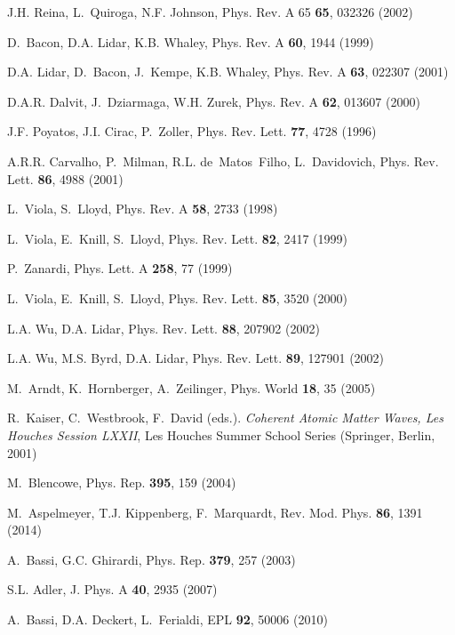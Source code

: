 \documentclass[aps,pra,reprint,amsmath,amssymb,showpacs,nofootinbib,floatfix,onecolumn,12pt]{revtex4-1}
\begin{document}
\begin{thebibliography}{100}
J.H. Reina, L.~Quiroga, N.F. Johnson, Phys. Rev. A 65 \textbf{65}, 032326
  (2002)

D.~Bacon, D.A. Lidar, K.B. Whaley, Phys. Rev. A \textbf{60}, 1944 (1999)

D.A. Lidar, D.~Bacon, J.~Kempe, K.B. Whaley, Phys. Rev. A \textbf{63}, 022307
  (2001)

D.A.R. Dalvit, J.~Dziarmaga, W.H. Zurek, Phys. Rev. A \textbf{62}, 013607
  (2000)

J.F. Poyatos, J.I. Cirac, P.~Zoller, Phys. Rev. Lett. \textbf{77}, 4728 (1996)

A.R.R. Carvalho, P.~Milman, R.L. de~Matos~Filho, L.~Davidovich, Phys. Rev.
  Lett. \textbf{86}, 4988 (2001)

L.~Viola, S.~Lloyd, Phys. Rev. A \textbf{58}, 2733 (1998)

L.~Viola, E.~Knill, S.~Lloyd, Phys. Rev. Lett. \textbf{82}, 2417 (1999)

P.~Zanardi, Phys. Lett. A \textbf{258}, 77 (1999)

L.~Viola, E.~Knill, S.~Lloyd, Phys. Rev. Lett. \textbf{85}, 3520 (2000)

L.A. Wu, D.A. Lidar, Phys. Rev. Lett. \textbf{88}, 207902 (2002)

L.A. Wu, M.S. Byrd, D.A. Lidar, Phys. Rev. Lett. \textbf{89}, 127901 (2002)

M.~Arndt, K.~Hornberger, A.~Zeilinger, Phys. World \textbf{18}, 35 (2005)

R.~Kaiser, C.~Westbrook, F.~David (eds.).
\newblock \emph{Coherent Atomic Matter Waves, Les Houches Session LXXII}, Les
  Houches Summer School Series (Springer, Berlin, 2001)

M.~Blencowe, Phys. Rep. \textbf{395}, 159 (2004)

M.~Aspelmeyer, T.J. Kippenberg, F.~Marquardt, Rev. Mod. Phys. \textbf{86}, 1391
  (2014)

A.~Bassi, G.C. Ghirardi, Phys. Rep. \textbf{379}, 257 (2003)

S.L. Adler, J. Phys. A \textbf{40}, 2935 (2007)

A.~Bassi, D.A. Deckert, L.~Ferialdi, EPL \textbf{92}, 50006 (2010)


\end{thebibliography}
\end{document}

